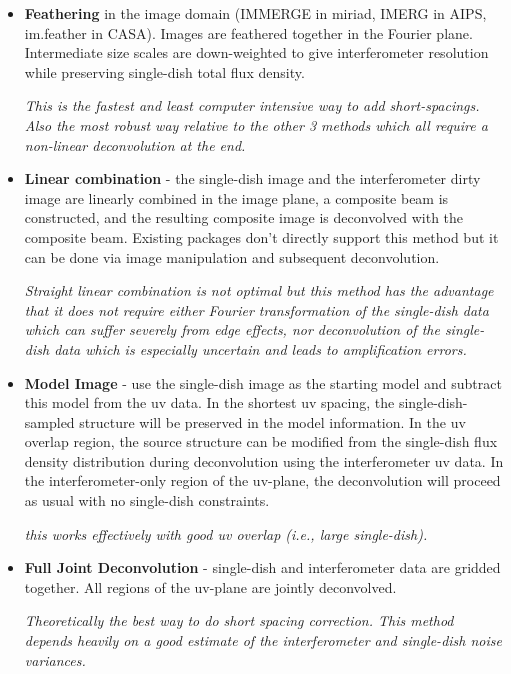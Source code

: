 \begin{itemize}
\item {\bf  Feathering} in the image domain (IMMERGE in miriad,
      IMERG in AIPS, im.feather in CASA). Images are feathered
      together in the Fourier plane. Intermediate size scales are
      down-weighted to give interferometer resolution while preserving
      single-dish total flux density.

      {\it This is the fastest and least computer intensive way to add
	short-spacings. Also the most robust way relative to the other
	3 methods which all require a non-linear deconvolution at the
	end.}

\item {\bf Linear combination} - the single-dish image and the
      interferometer dirty image are linearly combined in the image
      plane, a composite beam is constructed, and the resulting
      composite image is deconvolved with the composite beam. Existing
      packages don't directly support this method but it can be done
      via image manipulation and subsequent deconvolution.

      {\it Straight linear combination is not optimal but this method
	has the advantage that it does not require either Fourier
	transformation of the single-dish data which can suffer
	severely from edge effects, nor deconvolution of the
	single-dish data which is especially uncertain and leads to
	amplification errors.}

\item {\bf Model Image} - use the single-dish image as the starting
      model and subtract this model from the uv data. In the shortest
      uv spacing, the single-dish-sampled structure will be preserved
      in the model information. In the uv overlap region, the source
      structure can be modified from the single-dish flux density
      distribution during deconvolution using the interferometer uv
      data. In the interferometer-only region of the uv-plane, the
      deconvolution will proceed as usual with no single-dish
      constraints.

      {\it this works effectively with good uv overlap (i.e., large
      single-dish).} 

\item {\bf Full Joint Deconvolution} - single-dish and interferometer
      data are gridded together. All regions of the uv-plane are
      jointly deconvolved.

      {\it Theoretically the best way to do short spacing
	correction. This method depends heavily on a good estimate of
	the interferometer and single-dish noise variances.}
\end{itemize}

